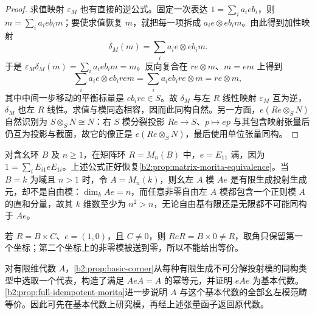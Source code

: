 \begin{proof}
	求值映射 \(\varepsilon_M\) 也有直接的逆公式。固定一次表达 \(1=\sum_i a_i e b_i\)，则 \(m=\sum_i a_i e b_i m\)；要使求值恢复 \(m\)，就把每一项拆成 \(a_i e\otimes e b_i m\)。由此得到加性映射
	\begin{equation}\label{b2:eq:full-idempotent-evaluation-inverse}
		\delta_M(m)=\sum_i a_i e\otimes e b_i m.
	\end{equation}
	于是 \(\varepsilon_M\delta_M(m)=\sum_i a_i e b_i m=m\)。反向复合在 \(re\otimes m\)、\(m=em\) 上得到
	\[
		\sum_i a_i e\otimes e b_i r e m =\sum_i a_i e b_i r e\otimes m=re\otimes m,
	\]
	其中中间一步移动的平衡标量是 \(e b_i r e\in S\)。故 \(\delta_M\) 与左 \(R\) 线性映射 \(\varepsilon_M\) 互为逆，\(\delta_M\) 也左 \(R\) 线性。求值与模同态相容，因而此同构自然。另一方面，\(e(Re\otimes_SN)\) 自然识别为 \(S\otimes_SN\cong N\)：右 \(S\) 模分裂投影 \(Re\rightarrow S\)、\(p\mapsto ep\) 与其包含映射张量后仍互为投影与截面，故它的像正是 \(e(Re\otimes_SN)\)，最后使用单位张量同构。
\end{proof}

对含幺环 \(B\) 及 \(n\ge1\)，在矩阵环 \(R=M_n(B)\) 中，\(e=E_{11}\) 满，因为 \(1=\sum_iE_{i1}eE_{1i}\)。上述公式正好恢复\cref{b2:prop:matrix-morita-equivalence}。当 \(B=k\) 为域且 \(n>1\) 时，令 \(A=M_n(k)\)，则幺左 \(A\) 模 \(Ae\) 是有限生成投射生成元，却不是自由模：\(\dim_kAe=n\)，而任意非零自由左 \(A\) 模都包含一个正则模 \(A\) 的直和分量，故其 \(k\) 维数至少为 \(n^2>n\)，无论自由基有限还是无限都不可能同构于 \(Ae\)。

\ProseParagraphBreak
若 \(R=B\times C\)、\(e=(1,0)\)，且 \(C\ne0\)，则 \(ReR=B\times0\ne R\)，取角只保留第一个坐标；第二个坐标上的非零模被送到零，所以不能给出等价。

\ProseParagraphBreak
对有限维代数 \(A\)，\cref{b2:prop:basic-corner}从每种有限生成不可分解投射模的同构类型中选取一个代表，构造了满足 \(AeA=A\) 的幂等元，并证明 \(eAe\) 为基本代数。\cref{b2:prop:full-idempotent-morita}进一步说明 \(A\) 与这个基本代数的全部幺左模范畴等价。因此可先在基本代数上研究模，再经上述张量函子返回原代数。


